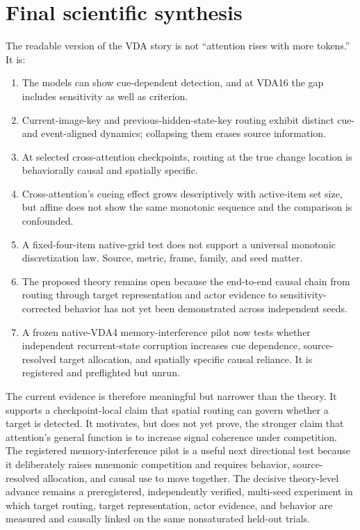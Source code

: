 \documentclass[11pt]{article}
\begin{document}
\section{Final scientific synthesis}
The readable version of the VDA story is not ``attention rises with more tokens.'' It is:

\begin{enumerate}
\item The models can show cue-dependent detection, and at VDA16 the gap includes sensitivity as well as criterion.
\item Current-image-key and previous-hidden-state-key routing exhibit distinct cue- and event-aligned dynamics; collapsing them erases source information.
\item At selected cross-attention checkpoints, routing at the true change location is behaviorally causal and spatially specific.
\item Cross-attention's cueing effect grows descriptively with active-item set size, but affine does not show the same monotonic sequence and the comparison is confounded.
\item A fixed-four-item native-grid test does not support a universal monotonic discretization law. Source, metric, frame, family, and seed matter.
\item The proposed theory remains open because the end-to-end causal chain from routing through target representation and actor evidence to sensitivity-corrected behavior has not yet been demonstrated across independent seeds.
\item A frozen native-VDA4 memory-interference pilot now tests whether independent recurrent-state corruption increases cue dependence, source-resolved target allocation, and spatially specific causal reliance. It is registered and preflighted but unrun.
\end{enumerate}

The current evidence is therefore meaningful but narrower than the theory. It supports a checkpoint-local claim that spatial routing can govern whether a target is detected. It motivates, but does not yet prove, the stronger claim that attention's general function is to increase signal coherence under competition. The registered memory-interference pilot is a useful next directional test because it deliberately raises mnemonic competition and requires behavior, source-resolved allocation, and causal use to move together. The decisive theory-level advance remains a preregistered, independently verified, multi-seed experiment in which target routing, target representation, actor evidence, and behavior are measured and causally linked on the same nonsaturated held-out trials.
\end{document}
